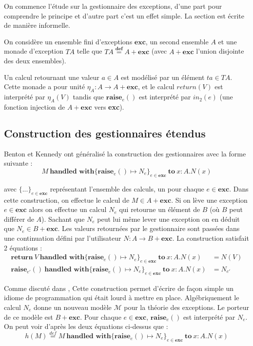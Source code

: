 On commence l'étude sur la gestionnaire des exceptions, d'une part pour comprendre le principe et d'autre part c'est un effet simple. La section est écrite de manière informelle.
\medbreak

On considère un ensemble fini d'exceptions $\textbf{exc}$, un second ensemble $A$ et 
une monade d'exception $TA$ telle que $TA \overset{\textbf{def}}{=} A + \textbf{exc}$ 
(avec $A + \textbf{exc}$ l'union disjointe des deux ensembles). 

Un calcul retournant une valeur $a \in A$ est modélisé par un élément $ta \in TA$. 
Cette monade a pour unité $\eta_A : A \rightarrow A + \textbf{exc}$, et le calcul 
$return(V)$ est interprété par $\eta_A(V)$ tandis que $\textbf{raise}_e()$ est 
interprété par $in_2(e)$ (une fonction injection de $A + \textbf{exc}$ vers \textbf{exc}).

\subsection{Construction des gestionnaires étendus}

	Benton et Kennedy ont généralisé la construction des gestionnaires avec la forme suivante :
	\[M~\textbf{handled~with} \{\textbf{raise}_e() \mapsto N_e\}_{e \in \textbf{exc}}~\textbf{to}~ x:A.N(x)\]
	
	avec $\{...\}_{e \in \textbf{exc}}$ représentant l'ensemble des calculs, un pour chaque $e \in \textbf{exc}$. Dans cette construction, 
	on effectue le calcul de $M \in A + \textbf{exc}$. Si on lève une exception 
	$e \in \textbf{exc}$ alors on effectue un calcul $N_e$ qui retourne un élément de $B$
	(où $B$ peut différer de $A$). Sachant que $N_e$ peut lui même lever une exception 
	on en déduit que $N_e \in B + \textbf{exc}$. Les valeurs retournées par le gestionnaire sont passées dans une continuation défini par l'utilisateur $N : A \rightarrow B + \textbf{exc}$. La construction satisfait 2 équations :
	\begin{align*}
		\textbf{return} ~V~\textbf{handled~with} \{\textbf{raise}_e() \mapsto N_e\}_{e \in \textbf{exc}}~\textbf{to}~ x:A.N(x) &= N(V)\\
		\textbf{raise}_{e'}()~\textbf{handled~with} \{\textbf{raise}_e() \mapsto N_e\}_{e \in \textbf{exc}}~\textbf{to}~ x:A.N(x) &= N_{e'}
	\end{align*}
	
	Comme discuté dans \cite{DBLP:journals/jfp/BentonK01}, Cette construction permet d'écrire de façon simple un idiome de programmation qui était lourd à mettre en place. 
	\smallbreak
	Algébriquement le calcul $N_e$ donne un nouveau modèle $\mathcal{M}$ pour la théorie des exceptions. Le porteur de ce modèle est $B + \textbf{exc}$. Pour chaque $e \in \textbf{exc}$, $\textbf{raise}_e()$ est interprété par $N_e$. On peut voir d'après les deux équations ci-dessus que :
	\[h(M) \overset{def}{=} M~\textbf{handled~with} \{\textbf{raise}_e() \mapsto N_e\}_{e \in \textbf{exc}}~\textbf{to}~ x:A.N(x)\]
	
